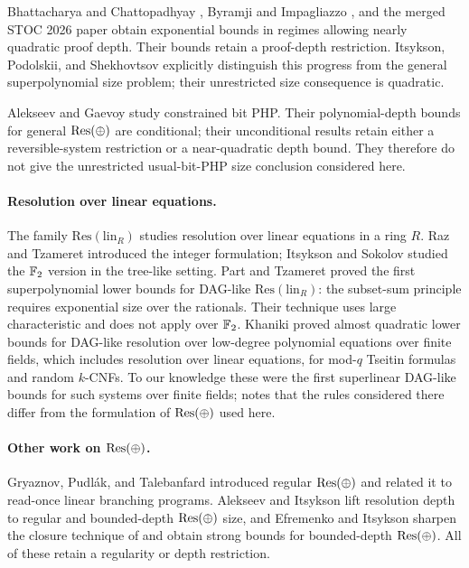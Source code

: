 Bhattacharya and Chattopadhyay \cite{BC25}, Byramji and Impagliazzo
\cite{BI25}, and the merged STOC 2026 paper \cite{BCBI26} obtain
exponential bounds in regimes allowing nearly quadratic proof depth.
Their bounds retain a proof-depth restriction. Itsykson, Podolskii,
and Shekhovtsov \cite{IPS26} explicitly distinguish this progress from
the general superpolynomial size problem; their unrestricted size
consequence is quadratic.

Alekseev and Gaevoy \cite{AG26} study constrained bit PHP. Their
polynomial-depth bounds for general \(\mathrm{Res}(\oplus)\) are conditional; their
unconditional results retain either a reversible-system restriction or
a near-quadratic depth bound. They therefore do not give the unrestricted
usual-bit-PHP size conclusion considered here.

\paragraph{Resolution over linear equations.}
The family \(\mathrm{Res}(\mathrm{lin}_R)\) studies resolution over linear
equations in a ring \(R\). Raz and Tzameret \cite{RT08} introduced the
integer formulation; Itsykson and Sokolov \cite{IS14,IS20} studied the
\(\mathbb F_2\) version in the tree-like setting. Part and Tzameret
\cite{PT21} proved the first superpolynomial lower bounds for DAG-like
\(\mathrm{Res}(\mathrm{lin}_R)\): the subset-sum principle requires
exponential size over the rationals. Their technique uses large
characteristic and does not apply over \(\mathbb F_2\). Khaniki \cite{Kha22} proved
almost quadratic lower bounds for DAG-like resolution over low-degree
polynomial equations over finite fields, which includes resolution over
linear equations, for mod-\(q\) Tseitin formulas and random \(k\)-CNFs.
To our knowledge these were the first superlinear DAG-like bounds for such
systems over finite fields; \cite{EGI25} notes that the rules considered
there differ from the formulation of \(\mathrm{Res}(\oplus)\) used here.

\paragraph{Other work on \(\mathrm{Res}(\oplus)\).}
Gryaznov, Pudl\'ak, and Talebanfard \cite{GPT22} introduced regular \(\mathrm{Res}(\oplus)\)
and related it to read-once linear branching programs. Alekseev and Itsykson
\cite{AI25} lift resolution depth to regular and bounded-depth \(\mathrm{Res}(\oplus)\) size,
and Efremenko and Itsykson \cite{EI25,EI26} sharpen the closure technique
of \cite{EGI25} and obtain strong bounds for bounded-depth \(\mathrm{Res}(\oplus)\). All of
these retain a regularity or depth restriction.

